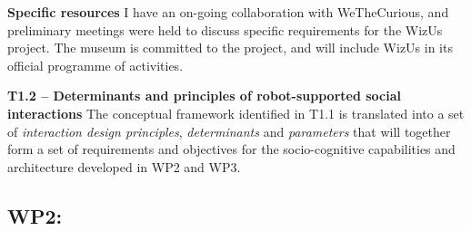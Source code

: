 \documentclass[11pt,a4paper]{report}
\newcommand{\project}{WizUs\xspace}
\begin{document}
\textbf{Specific resources} I have an on-going collaboration with WeTheCurious,
and preliminary meetings were held to discuss specific requirements for the
\project project. The museum is committed to the project, and will include
\project in its official programme of activities.

% 
% 
% 
% 
% 
% 
% 
% 
% 



\textbf{T1.2 -- Determinants and principles of robot-supported social
interactions} The conceptual framework identified in T1.1 is translated
into a set of \emph{interaction design principles}, \emph{determinants} and
\emph{parameters} that will together form a set of requirements and objectives
for the socio-cognitive capabilities and architecture developed in WP2 and WP3.

\subsection{WP2: \textbf{\wpTwo}}

\noindent{}
\end{document}
